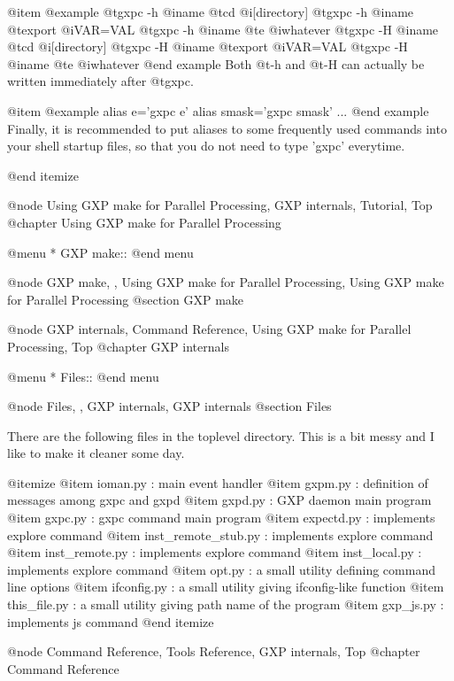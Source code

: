 @item 
@example
@t{gxpc -h} @i{name} @t{cd} @i{[directory]}
@t{gxpc -h} @i{name} @t{export} @i{VAR=VAL}
@t{gxpc -h} @i{name} @t{e} @i{whatever}
@t{gxpc -H} @i{name} @t{cd} @i{[directory]}
@t{gxpc -H} @i{name} @t{export} @i{VAR=VAL}
@t{gxpc -H} @i{name} @t{e} @i{whatever}
@end example
Both @t{-h} and @t{-H} can actually be written immediately after @t{gxpc}.

@item
@example
alias e='gxpc e'
alias smask='gxpc smask'
...
@end example
Finally, it is recommended to put aliases to some frequently used
commands into your shell startup files, so that you do not need to
type 'gxpc' everytime.


@end itemize



@node Using GXP make for Parallel Processing, GXP internals, Tutorial, Top
@chapter Using GXP make for Parallel Processing

@menu
* GXP make::                    
@end menu

@node GXP make,  , Using GXP make for Parallel Processing, Using GXP make for Parallel Processing
@section GXP make

@node GXP internals, Command Reference, Using GXP make for Parallel Processing, Top
@chapter GXP internals

@menu
* Files::                       
@end menu

@node Files,  , GXP internals, GXP internals
@section Files

There are the following files in the toplevel directory.  This is a bit
messy and I like to make it cleaner some day.

@itemize
@item 
ioman.py : main event handler
@item 
gxpm.py : definition of messages among gxpc and gxpd
@item 
gxpd.py : GXP daemon main program
@item 
gxpc.py : gxpc command main program
@item 
expectd.py : implements explore command
@item 
inst_remote_stub.py : implements explore command
@item 
inst_remote.py : implements explore command
@item 
inst_local.py : implements explore command
@item 
opt.py : a small utility defining command line options
@item 
ifconfig.py : a small utility giving ifconfig-like function
@item 
this_file.py : a small utility giving path name of the program
@item 
gxp_js.py : implements js command
@end itemize


@node Command Reference, Tools Reference, GXP internals, Top
@chapter Command Reference

